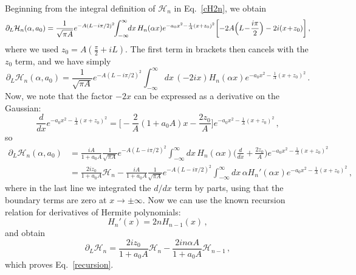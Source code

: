 \documentclass[a4,letterpaper,11pt]{article}
\newcommand{\nn}{\nonumber}
\newcommand{\be}{\begin{equation}}
\newcommand{\ee}{\end{equation}}
\newcommand{\minus}{\!-\!}
\newcommand{\plus}{\!+\!}
\newcommand{\cH}{\mathcal{H}}
\newcommand{\eq}[1]{Eq.~\eqref{#1}}
\begin{document}
Beginning from the integral definition of $\cH_n$ in \eq{cH2n}, we obtain
\be
\partial_L \cH_n(\alpha,a_0) = \frac{1}{\sqrt{\pi A}} e^{-A(L-i\pi/2)^2} \!\! \int_{-\infty}^\infty \!\! dx\,H_n(\alpha x) e^{-a_0 x^2 - \frac{1}{A}(x+z_0)^2 } \biggl[ -2A\Bigl(L \minus \frac{i\pi}{2}\Bigr) - 2i(x\plus z_0)\biggr] \,,
\ee
where we used $z_0 = A(\frac{\pi}{2} + iL)$. The first term in brackets then cancels with the $z_0$ term, and we have simply
\be
\partial_L \cH_n(\alpha,a_0) = \frac{1}{\sqrt{\pi A}} e^{-A(L-i\pi/2)^2} \!\! \int_{-\infty}^\infty \!\! dx\, (-2ix) H_n(\alpha x) e^{-a_0 x^2 - \frac{1}{A}(x+z_0)^2 }\,.
\ee
Now, we note that the factor $-2x$ can be expressed as a derivative on the Gaussian:
\be
\frac{d}{dx}e^{-a_0 x^2 - \frac{1}{A}(x+z_0)^2 } = \biggl[ -\frac{2}{A}(1+a_0 A) x - \frac{2z_0}{A}\biggr]e^{-a_0 x^2 - \frac{1}{A}(x+z_0)^2 }\,,
\ee
so
\begin{align}
\partial_L \cH_n(\alpha,a_0) &= \frac{iA}{1+a_0A} \frac{1}{\sqrt{\pi A}}  e^{-A(L-i\pi/2)^2} \!\! \int_{-\infty}^\infty \!\! dx\, H_n(\alpha x) \biggl( \frac{d}{dx} + \frac{2z_0}{A}\biggr)e^{-a_0 x^2 - \frac{1}{A}(x+z_0)^2 } \\
&= \frac{2iz_0}{1+a_0A} \cH_n - \frac{iA}{1+a_0A}  \frac{1}{\sqrt{\pi A}} e^{-A(L-i\pi/2)^2} \!\! \int_{-\infty}^\infty \!\! dx\, \alpha H_n'(\alpha x) e^{-a_0 x^2 - \frac{1}{A}(x+z_0)^2 } \,,\nn
\end{align}
where in the last line we integrated the $d/dx$ term by parts, using that the boundary terms are zero at $x\to \pm \infty$. Now we can use the known recursion relation for derivatives of Hermite polynomials:
\be
H_n'(x) = 2n H_{n-1}(x)\,,
\ee
and obtain
\be
\partial_L\cH_n = \frac{2iz_0}{1+a_0A}\cH_n - \frac{2in\alpha A}{1+a_0 A} \cH_{n-1}\,,
\ee
which proves \eq{recursion}.

\end{document}
